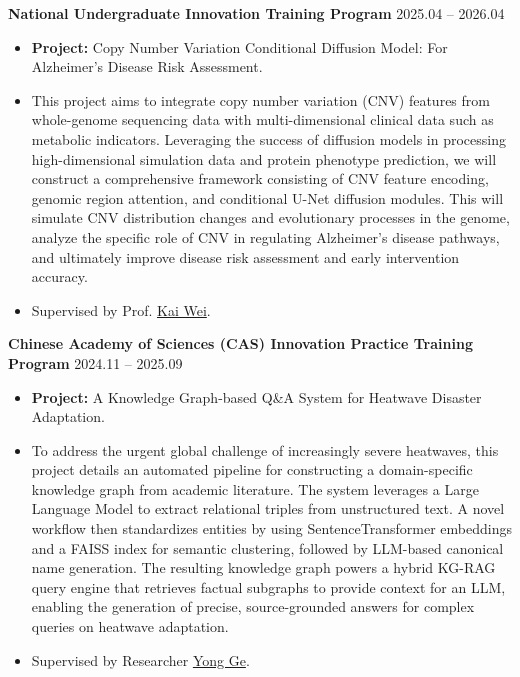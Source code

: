 \documentclass[11pt]{article}
\begin{document}
	\vspace{10pt}

	\textbf{National Undergraduate Innovation Training Program} \hfill 2025.04 – 2026.04
	\begin{itemize}[noitemsep, topsep=0pt, partopsep=0pt, parsep=0pt, leftmargin=*]
		\item \textbf{Project:} Copy Number Variation Conditional Diffusion Model: For Alzheimer's Disease Risk Assessment.
		\item {\small This project aims to integrate copy number variation (CNV) features from whole-genome sequencing data with multi-dimensional clinical data such as metabolic indicators. Leveraging the success of diffusion models in processing high-dimensional simulation data and protein phenotype prediction, we will construct a comprehensive framework consisting of CNV feature encoding, genomic region attention, and conditional U-Net diffusion modules. This will simulate CNV distribution changes and evolutionary processes in the genome, analyze the specific role of CNV in regulating Alzheimer's disease pathways, and ultimately improve disease risk assessment and early intervention accuracy.}
		\item Supervised by Prof. \href{https://scholar.google.com/citations?user=LLj__mMAAAAJ}{Kai Wei}.
	\end{itemize}

	\vspace{10pt}

	\textbf{Chinese Academy of Sciences (CAS) Innovation Practice Training Program} \hfill 2024.11 – 2025.09
	\begin{itemize}[noitemsep, topsep=0pt, partopsep=0pt, parsep=0pt, leftmargin=*]
		\item \textbf{Project:} A Knowledge Graph-based Q\&A System for Heatwave Disaster Adaptation.
		\item {\small To address the urgent global challenge of increasingly severe heatwaves, this project details an automated pipeline for constructing a domain-specific knowledge graph from academic literature. The system leverages a Large Language Model to extract relational triples from unstructured text. A novel workflow then standardizes entities by using SentenceTransformer embeddings and a FAISS index for semantic clustering, followed by LLM-based canonical name generation. The resulting knowledge graph powers a hybrid KG-RAG query engine that retrieves factual subgraphs to provide context for an LLM, enabling the generation of precise, source-grounded answers for complex queries on heatwave adaptation.}
		\item Supervised by Researcher \href{https://scholar.google.com/citations?user=OQDwnVUAAAAJ}{Yong Ge}.
	\end{itemize}
\end{document}
